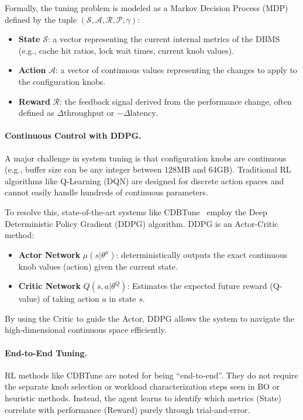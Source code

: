 Formally, the tuning problem is modeled as a Markov Decision Process (MDP) defined by the tuple $(\mathcal{S}, \mathcal{A}, \mathcal{R}, \mathcal{P}, \gamma)$:
\begin{itemize}
  \item \textbf{State} $\mathcal{S}$: a vector representing the current internal metrics of the DBMS (e.g., cache hit ratios, lock wait times, current knob values).
  \item \textbf{Action} $\mathcal{A}$: a vector of continuous values representing the changes to apply to the configuration knobs.
  \item \textbf{Reward} $\mathcal{R}$: the feedback signal derived from the performance change, often defined as $\Delta \text{throughput}$ or $-\Delta \text{latency}$.
\end{itemize}

\paragraph{Continuous Control with DDPG.}

A major challenge in system tuning is that configuration knobs are continuous (e.g., buffer size can be any integer between 128MB and 64GB).
Traditional RL algorithms like Q-Learning (DQN) are designed for discrete action spaces and cannot easily handle hundreds of continuous parameters.

To resolve this, state-of-the-art systems like CDBTune~\cite{cdbtune} employ the Deep Deterministic Policy Gradient (DDPG) algorithm.
DDPG is an Actor-Critic method:
\begin{itemize}
  \item \textbf{Actor Network} $\mu(s|\theta^\mu)$: deterministically outputs the exact continuous knob values (action) given the current state.
  \item \textbf{Critic Network} $Q(s, a|\theta^Q)$: Estimates the expected future reward (Q-value) of taking action $a$ in state $s$.
\end{itemize}
By using the Critic to guide the Actor, DDPG allows the system to navigate the high-dimensional continuous space efficiently.

\paragraph{End-to-End Tuning.}
RL methods like CDBTune are noted for being ``end-to-end''.
They do not require the separate knob selection or workload characterization steps seen in BO or heuristic methods.
Instead, the agent learns to identify which metrics (State) correlate with performance (Reward) purely through trial-and-error.

